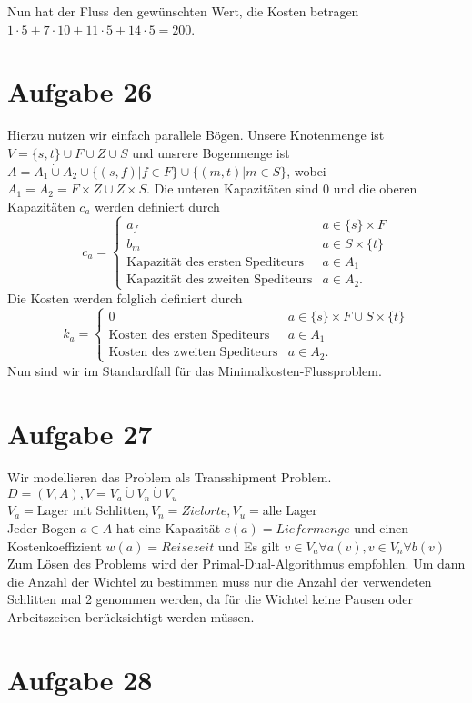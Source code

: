 \documentclass[a4paper,12pt,german]{scrartcl}
\begin{document}
 Nun hat der Fluss den gewünschten Wert, die Kosten betragen $1\cdot 5+7\cdot 10+11\cdot 5+14\cdot 5=200$.
 \section*{Aufgabe 26}
 Hierzu nutzen wir einfach parallele Bögen. Unsere Knotenmenge ist $V=\{s,t\}\cup F\cup Z\cup S$ und unsrere Bogenmenge ist $A=A_1\dot\cup A_2\cup \{(s,f)|f\in F\}\cup\{(m,t)|m\in S\}$, wobei $A_1=A_2=F\times Z\cup Z\times S$. Die unteren Kapazitäten sind 0 und die oberen Kapazitäten $c_a$ werden definiert durch
 $$c_a=\begin{cases} a_f&a\in\{s\}\times F\\
                     b_m&a\in S\times\{t\}\\
                     \text{Kapazität des ersten Spediteurs}&a\in A_1\\
                     \text{Kapazität des zweiten Spediteurs}&a\in A_2.
       \end{cases}$$
 Die Kosten werden folglich definiert durch
 $$k_a=\begin{cases} 0&a\in\{s\}\times F\cup S\times\{t\}\\
                     \text{Kosten des ersten Spediteurs}&a\in A_1\\
                     \text{Kosten des zweiten Spediteurs}&a\in A_2.
       \end{cases}$$
 Nun sind wir im Standardfall für das Minimalkosten-Flussproblem.
\section*{Aufgabe 27}
Wir modellieren das Problem als Transshipment Problem. $D=(V,A), V=V_a \mathbin{\dot{\cup}} V_n \mathbin{\dot{\cup}} V_u$ \\
$V_a=$Lager mit Schlitten$,V_n=Zielorte,V_u=$alle Lager\\
Jeder Bogen $a\in A$ hat eine Kapazit\"at $c(a)=Liefermenge$ und einen Kostenkoeffizient $w(a)=Reisezeit$ und Es gilt $v \in V_a \forall a(v), v \in V_n \forall b(v)$\\
Zum L\"osen des Problems wird der Primal-Dual-Algorithmus empfohlen. Um dann die Anzahl der Wichtel zu bestimmen muss nur die Anzahl der verwendeten Schlitten mal 2 genommen werden, da f\"ur die Wichtel keine Pausen oder Arbeitszeiten ber\"ucksichtigt werden m\"ussen.
\section*{Aufgabe 28}
\end{document}
